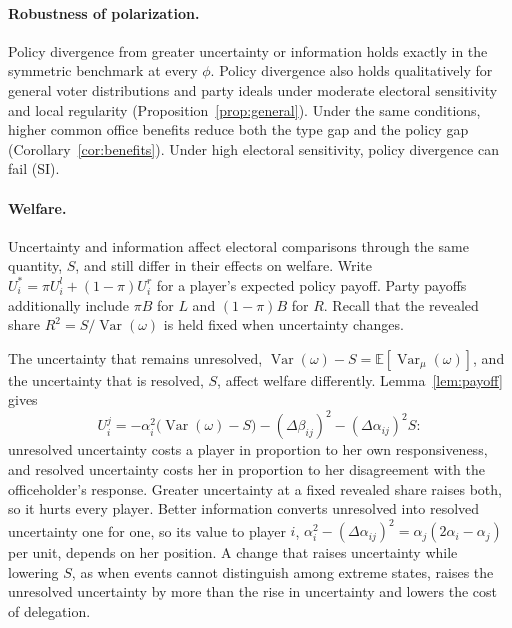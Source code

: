 \documentclass[12pt,letterpaper]{article}
\begin{document}
\paragraph{Robustness of polarization.}\label{sec:general-G}
Policy divergence from greater uncertainty or information holds exactly in the symmetric benchmark at every $\phi$. Policy divergence also holds qualitatively for general voter distributions and party ideals under moderate electoral sensitivity and local regularity (Proposition~\ref{prop:general}). Under the same conditions, higher common office benefits reduce both the type gap and the policy gap (Corollary~\ref{cor:benefits}). Under high electoral sensitivity, policy divergence can fail (SI).

\paragraph{Welfare.}
Uncertainty and information affect electoral comparisons through the same quantity, $S$, and still differ in their effects on welfare. Write $U_i^*=\pi U_i^l+(1-\pi)U_i^r$ for a player's expected policy payoff. Party payoffs additionally include $\pi B$ for $L$ and $(1-\pi)B$ for $R$. Recall that the revealed share $R^2=S/\operatorname{Var}(\omega)$ is held fixed when uncertainty changes.

The uncertainty that remains unresolved, $\operatorname{Var}(\omega)-S=\mathbb{E}[\operatorname{Var}_\mu(\omega)]$, and the uncertainty that is resolved, $S$, affect welfare differently. Lemma~\ref{lem:payoff} gives
\[
U_i^j=-\alpha_i^2\big(\operatorname{Var}(\omega)-S\big)-(\Delta\beta_{ij})^2-(\Delta\alpha_{ij})^2S:
\]
unresolved uncertainty costs a player in proportion to her own responsiveness, and resolved uncertainty costs her in proportion to her disagreement with the officeholder's response. Greater uncertainty at a fixed revealed share raises both, so it hurts every player. Better information converts unresolved into resolved uncertainty one for one, so its value to player $i$, $\alpha_i^2-(\Delta\alpha_{ij})^2=\alpha_j(2\alpha_i-\alpha_j)$ per unit, depends on her position. A change that raises uncertainty while lowering $S$, as when events cannot distinguish among extreme states, raises the unresolved uncertainty by more than the rise in uncertainty and lowers the cost of delegation.
\end{document}
